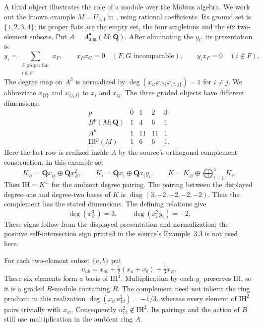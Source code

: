 A third object illustrates the role of a module over the M\"obius
algebra. We work out the known example $M=U_{3,4}$ in
\cite[Definitions~2.2, 2.5 and~3.4, Example~3.7]{BHM26SingularHodge},
using rational coefficients. Its ground set is $\{1,2,3,4\}$; its
proper flats are the empty set, the four singletons and the six
two-element subsets. Put $A=A^\bullet_{\mathrm{aug}}(M;\mathbf Q)$.
After eliminating the $y_i$, its presentation is
\[
 y_i=\sum_{\substack{F\text{ proper flat}\\i\notin F}}x_F,
 \qquad x_Fx_G=0\quad(F,G\text{ incomparable}),
 \qquad y_ix_F=0\quad(i\notin F).
\]
The degree map on $A^3$ is normalized by
$\deg(x_\varnothing x_{\{i\}}x_{\{i,j\}})=1$ for $i\ne j$.
We abbreviate $x_{\{i\}}$ and $x_{\{i,j\}}$ to $x_i$ and $x_{ij}$.
The three graded objects have different dimensions:
\[
 \begin{array}{c|rrrr}
  p&0&1&2&3\\\hline
  B^p(M;\mathbf Q)&1&4&6&1\\
  A^p&1&11&11&1\\
  \mathrm{IH}^p(M)&1&6&6&1.
 \end{array}
\]
Here the last row is realized inside $A$ by the source's orthogonal
complement construction. In this example set
\[
 K_\varnothing=\mathbf Qx_\varnothing\oplus
                \mathbf Qx_\varnothing^2,
 \qquad K_i=\mathbf Qx_i\oplus\mathbf Qx_iy_i,
 \qquad K=K_\varnothing\oplus\bigoplus_{i=1}^4K_i.
\]
Then $\mathrm{IH}=K^\perp$ for the ambient degree pairing. The
pairing between the displayed degree-one and degree-two bases of $K$
is $\operatorname{diag}(3,-2,-2,-2,-2)$. Thus the complement has
the stated dimensions. The defining relations give
\[
 \deg(x_\varnothing^3)=3,\qquad
 \deg(x_i^2y_i)=-2.
\]
These signs follow from the displayed presentation and normalization;
the positive self-intersection sign printed in the source's
Example~3.3 is not used here.

For each two-element subset $\{a,b\}$ put
\[
 u_{ab}=x_{ab}+\tfrac12(x_a+x_b)+\tfrac13x_\varnothing.
\]
These six elements form a basis of $\mathrm{IH}^1$. Multiplication
by each $y_i$ preserves $\mathrm{IH}$, so it is a graded $B$-module
containing $B$. The complement need not inherit the ring product:
in this realization
$\deg(x_\varnothing u_{12}^2)=-1/3$, whereas every element of
$\mathrm{IH}^2$ pairs trivially with $x_\varnothing$.
Consequently $u_{12}^2\notin\mathrm{IH}^2$. Its pairings and the
action of $B$ still use multiplication in the ambient ring $A$.

